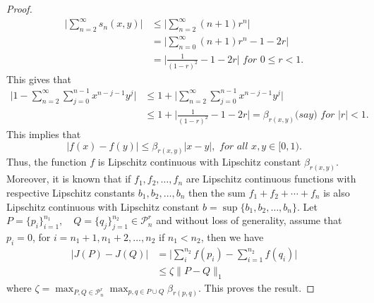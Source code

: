 \documentclass[pdflatex]{sn-jnl}%
\theoremstyle{thmstyleone}
\theoremstyle{thmstyletwo}%
\theoremstyle{thmstylethree}%
\begin{document}
\begin{proof}
\begin{equation}
\begin{split}
        \bigg|\sum_{n=2}^{\infty}s_n(x, y)\bigg|&\leq \bigg|\sum_{n=2}^{\infty}(n+1)r^n\bigg|\\
        &=\bigg|\sum_{n=0}^{\infty}(n+1)r^n-1-2r\bigg| \\
        &=\bigg|\frac{1}{{\left(1-r\right)}^2}-1-2r\bigg| \textit{ \ \ for $0\leq r<1$.}
\end{split}
\end{equation}
This gives that 
\begin{equation}\label{rfunction}
\begin{split}
   \Bigg|1-\sum_{n=2}^{\infty}\sum_{j=0}^{n-1}x^{n-j-1}y^j \Bigg|&\leq 1+\Bigg|\sum_{n=2}^{\infty}\sum_{j=0}^{n-1}x^{n-j-1}y^j\Bigg| \\ &\leq 1+\bigg|\frac{1}{{\left(1-r\right)}^2}-1-2r\bigg|=\beta_{r(x,y)} \textit{(say)} \textit{ \ \ \ \ \ \ \ for $|r|<1$.} 
\end{split}
\end{equation}
This implies that 
\begin{equation}
    |f(x)-f(y)|\leq \beta_{r(x,y)} |x-y|, \textit{ \ \ for all $x,y\in [0,1)$}.
\end{equation}
Thus, the function $f$ is Lipschitz continuous with Lipschitz constant $\beta_{r(x,y)}$. Moreover, it is known that if $f_1, f_2, \ldots, f_n$ are Lipschitz continuous functions with respective Lipschitz constants $b_1, b_2, \ldots, b_n$ then the sum $f_1 + f_2 + \cdots + f_n$ is also Lipschitz continuous with Lipschitz constant $b = \sup\{b_1, b_2, \ldots, b_n\}$. Let \( P = \{p_i\}_{i=1}^{n_1}, \quad Q = \{q_j\}_{j=1}^{n_2} \in \mathcal{P}^r_n \)
 and without loss of generality, assume that $p_i=0$, for $i=n_1+1, n_1+2,...,n_2$ if $n_1<n_2$, then we have
\begin{equation}
\begin{split}
    |J(P)-J(Q)|&=\bigg|\sum_{i}^{n_2}f(p_i)-\sum_{i=1}^{n_2}f(q_i)\bigg|\\
    &\leq \zeta \|P - Q\|_1
\end{split}
\end{equation}
where $\zeta=\max_{P,Q\in \mathcal{P}^r_n}\max_{p,q\in P\cup Q}{\beta_{r(p,q)}}$. This proves the result.
\end{proof}
\end{document}
